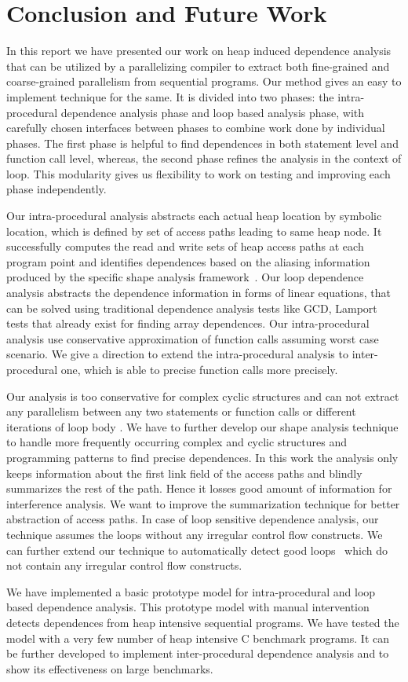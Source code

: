 \chapter{Conclusion and Future Work}
\label{ch:conclusion}
In this report we have presented our work on heap induced 
dependence analysis that can be utilized by a parallelizing 
compiler to extract both fine-grained and coarse-grained parallelism 
from sequential programs. Our method gives an easy to implement 
technique for the same. It is divided into two phases: 
the intra-procedural dependence analysis phase and loop 
based analysis phase, with carefully chosen interfaces between phases to 
combine work done by individual phases. The first phase is helpful 
to find dependences in both statement level and function 
call level, whereas, the second phase refines the analysis in the 
context of loop. This modularity gives us flexibility to work 
on testing and improving each phase independently. 

Our intra-procedural analysis abstracts each actual heap location 
by symbolic location, which is defined by set of access 
paths leading to same heap node. It successfully computes 
the read and write sets of heap access paths at each program point 
and identifies dependences based on the aliasing information produced 
by the specific shape analysis framework~\cite{sandeep}. 
Our loop dependence analysis abstracts the dependence 
information in forms of linear equations, that can be solved using traditional 
dependence analysis tests like GCD, Lamport tests that already 
exist for finding array dependences. 
Our intra-procedural analysis use conservative approximation of function calls 
assuming worst case scenario. We give a direction to extend the 
intra-procedural analysis to inter-procedural one, which is able to precise 
function calls more precisely. 


Our analysis is too conservative for complex cyclic structures and can 
not extract any parallelism between any two statements or 
function calls or different iterations of loop body . We have 
to further develop our shape analysis 
technique to handle more frequently occurring complex and cyclic 
structures and programming patterns to find precise dependences. 
In this work the analysis only keeps information about the first 
link field of the access paths and blindly summarizes the rest of the path. Hence 
it losses good amount of information for interference analysis.  
We want to improve the summarization technique for better abstraction of access paths. 
In case of loop sensitive dependence analysis, our technique assumes the loops without 
any irregular control flow constructs. We can further extend our technique to automatically 
detect good loops~\cite{ghiya98detecting} which do not contain any irregular control flow constructs. 

We have implemented a basic prototype model for intra-procedural 
and loop based dependence analysis. This prototype model with manual intervention 
detects dependences from heap intensive sequential programs. We have tested 
the model with a very few number of heap intensive C benchmark programs. 
It can be further developed to implement inter-procedural dependence 
analysis and to show its effectiveness on large benchmarks. 


